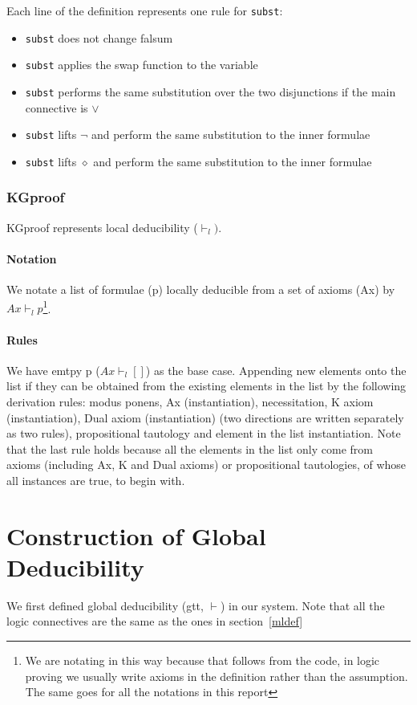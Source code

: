 \documentclass[submission,copyright,creativecommons]{eptcs}
\begin{document}
Each line of the definition represents one rule for \texttt{subst}:
\begin{itemize}
\item \texttt{subst} does not change falsum 
\item \texttt{subst} applies the swap function to the variable
\item \texttt{subst} performs the same substitution over the two disjunctions 
if the main connective is $\vee$
\item \texttt{subst} lifts $\neg$ and perform the same substitution 
to the inner formulae
\item \texttt{subst} lifts $\diamond$ and perform the same substitution 
to the inner formulae
\end{itemize}

\subsubsection{KGproof}
KGproof represents local deducibility ($\vdash_l)$.
\paragraph{Notation} We notate a list of formulae (p) locally deducible 
from a set of axioms (Ax) by $Ax \vdash_l p$\footnote{We are notating in this way because that follows 
from the code, in logic proving we usually write axioms in the definition rather than the assumption. The same goes 
for all the notations in this report}. 
\paragraph{Rules} We have emtpy p ($Ax \vdash_l []$) as the base case. 
Appending new elements onto the list if they can be obtained from the existing 
elements in the list by the following derivation rules: modus ponens, Ax (instantiation), 
necessitation, K axiom (instantiation), Dual axiom (instantiation) (two directions are written separately as 
two rules), propositional tautology and element in the list instantiation. 
Note that the last rule holds because all the elements in the list only 
come from axioms (including Ax, K and Dual axioms) or propositional tautologies, 
of whose all instances are true, to begin with. 



\section{Construction of Global Deducibility}
We first defined global deducibility (gtt, $\vdash$) in our system.
Note that all the logic connectives are the same as the ones in section~\ref{mldef}
\end{document}
